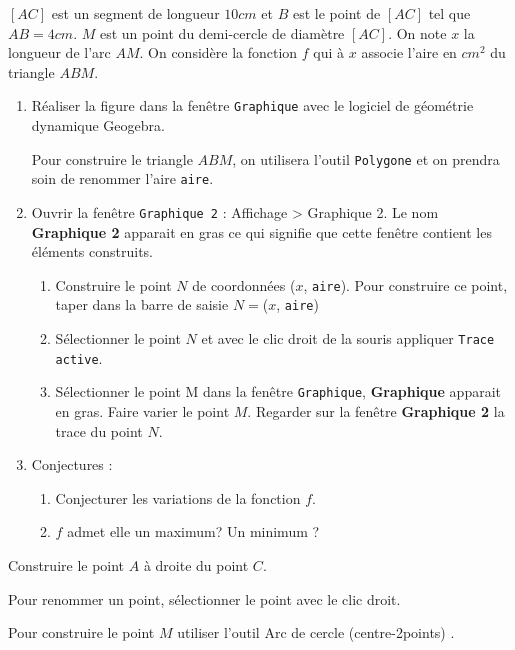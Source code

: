 
$[AC]$ est un segment de longueur $10 cm$ et $B$ est le point de $[AC]$ tel que $AB = 4 cm$. $M$ est un point du
demi-cercle de diamètre $[AC]$. On note $x$ la longueur de l'arc $AM$. On considère la fonction $f$ qui à $x$
associe l'aire en $cm^2$ du triangle $ABM$.
\begin{enumerate}
\item Réaliser la figure dans la fenêtre \texttt{Graphique} avec le logiciel de géométrie dynamique Geogebra.
\begin{Rq}
Pour construire le triangle $ABM$, on utilisera l'outil \texttt{Polygone} et on prendra soin de renommer l'aire \texttt{aire}. 
\end{Rq}
\item Ouvrir la fenêtre \texttt{Graphique 2} : Affichage > Graphique 2. Le nom \textbf{Graphique 2} apparait en gras ce qui signifie que cette fenêtre contient les éléments construits.
\begin{enumerate}
\item Construire le point $N$ de coordonnées ($x$, \texttt{aire}). Pour construire ce point, taper dans la barre de saisie $N =$($x$, \texttt{aire})
\item Sélectionner le point $N$ et avec le clic droit de la souris appliquer \texttt{Trace active}.
\item Sélectionner le point M dans la fenêtre \texttt{Graphique}, \textbf{Graphique} apparait en gras. Faire varier le point $M$. Regarder sur la fenêtre \textbf{Graphique 2} la trace du point $N$.
\end{enumerate}
\item Conjectures :
	\begin{enumerate}
		\item Conjecturer les variations de la fonction $f$.
		\item $f$ admet elle un maximum? Un minimum ?
	\end{enumerate}
\end{enumerate}

\begin{CdP}
Construire le point $A$ à droite du point $C$.  
\end{CdP}
\begin{CdP}
Pour renommer un point, sélectionner le point avec le clic droit.  
\end{CdP}
\begin{CdP}
Pour construire le point $M$ utiliser l'outil Arc de cercle (centre-2points) .  
\end{CdP}